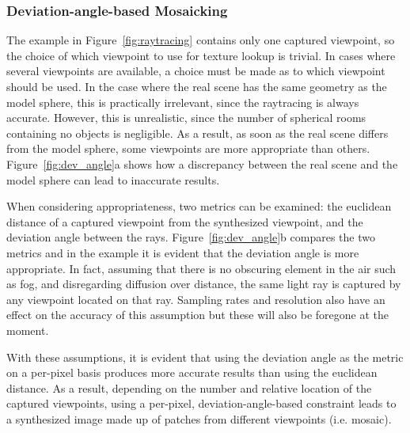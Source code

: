 

\subsubsection{Deviation-angle-based Mosaicking}
The example in Figure~\ref{fig:raytracing} contains only one captured viewpoint, so the choice of which viewpoint to use for texture lookup is trivial. In cases where several viewpoints are available, a choice must be made as to which viewpoint should be used. In the case where the real scene has the same geometry as the model sphere, this is practically irrelevant, since the raytracing is always accurate. However, this is unrealistic, since the number of spherical rooms containing no objects is negligible. As a result, as soon as the real scene differs from the model sphere, some viewpoints are more appropriate than others. Figure~\ref{fig:dev_angle}a shows how a discrepancy between the real scene and the model sphere can lead to inaccurate results.

When considering appropriateness, two metrics can be examined: the euclidean distance of a captured viewpoint from the synthesized viewpoint, and the deviation angle between the rays. Figure~\ref{fig:dev_angle}b compares the two metrics and in the example it is evident that the deviation angle is more appropriate. In fact, assuming that there is no obscuring element in the air such as fog, and disregarding diffusion over distance, the same light ray is captured by any viewpoint located on that ray. Sampling rates and resolution also have an effect on the accuracy of this assumption but these will also be foregone at the moment.

With these assumptions, it is evident that using the deviation angle as the metric on a per-pixel basis produces more accurate results than using the euclidean distance. As a result, depending on the number and relative location of the captured viewpoints, using a per-pixel, deviation-angle-based constraint leads to a synthesized image made up of patches from different viewpoints (i.e. mosaic). 

